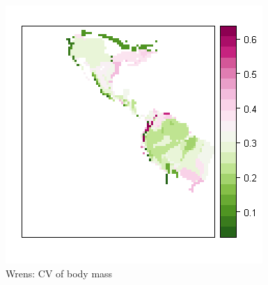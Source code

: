 \documentclass[ a4paper ]{article}
\begin{document}
	
\begin{figure}[htbp]
  \begin{center}
	\includegraphics[width=0.5\linewidth]{map2b}
    \caption{\label{fig:map2b} Wrens: CV of body mass}
  \end{center}
\end{figure}	
	
\end{document}
